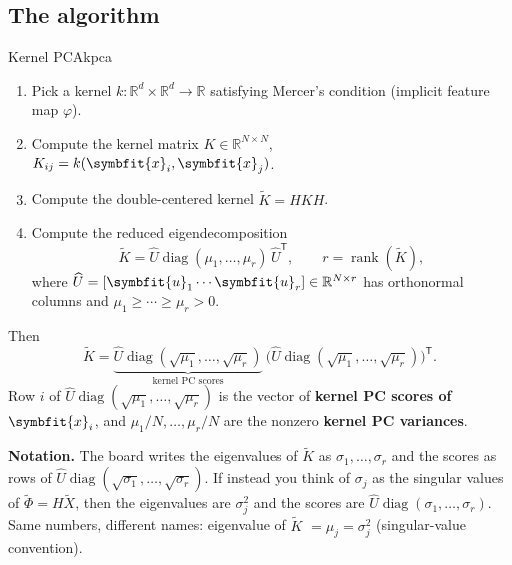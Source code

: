 \documentclass[11pt]{article}
\newcommand{\bm}[1]{\symbfit{#1}}
\newcommand{\R}{\mathbb{R}}
\newcommand{\vx}{\bm{x}}
\newcommand{\vu}{\bm{u}}
\newcommand{\T}{^{\mathsf T}}
\newcommand{\rank}{\operatorname{rank}}
\newcommand{\diag}{\operatorname{diag}}
\begin{document}
\subsection{The algorithm}\label{sec:kpca-alg}

\begin{algorithm}{Kernel PCA}{kpca}
\begin{enumerate}[nosep,label=\arabic*)]
\item Pick a kernel $k:\R^d\times\R^d\to\R$ satisfying Mercer's condition (implicit feature map $\varphi$).
\item Compute the kernel matrix $K\in\R^{N\times N}$, $K_{ij}=k(\vx_i,\vx_j)$.
\item Compute the double-centered kernel $\widetilde K=HKH$.
\item Compute the reduced eigendecomposition
\[
\widetilde K=\widehat U\diag(\mu_1,\dots,\mu_r)\,\widehat U\T,\qquad r=\rank(\widetilde K),
\]
where $\widehat U=[\vu_1\cdots\vu_r]\in\R^{N\times r}$ has orthonormal columns and $\mu_1\ge\cdots\ge\mu_r>0$.
\end{enumerate}
Then
\[
\widetilde K=\underbrace{\widehat U\diag(\sqrt{\mu_1},\dots,\sqrt{\mu_r})}_{\text{kernel PC scores}}\ \big(\widehat U\diag(\sqrt{\mu_1},\dots,\sqrt{\mu_r})\big)\T .
\]
Row $i$ of $\widehat U\diag(\sqrt{\mu_1},\dots,\sqrt{\mu_r})$ is the vector of \textbf{kernel PC scores of
$\vx_i$}, and $\mu_1/N,\dots,\mu_r/N$ are the nonzero \textbf{kernel PC variances}.
\end{algorithm}

\begin{careful}
\textbf{Notation.} The board writes the eigenvalues of $\widetilde K$ as $\sigma_1,\dots,\sigma_r$ and
the scores as rows of $\widehat U\diag(\sqrt{\sigma_1},\dots,\sqrt{\sigma_r})$. If instead you think of
$\sigma_j$ as the singular values of $\widetilde\Phi=H\widetilde X$, then the eigenvalues are
$\sigma_j^2$ and the scores are $\widehat U\diag(\sigma_1,\dots,\sigma_r)$. Same numbers, different
names: eigenvalue of $\widetilde K$ $=\mu_j=\sigma_j^2$ (singular-value convention).
\end{careful}
\end{document}
